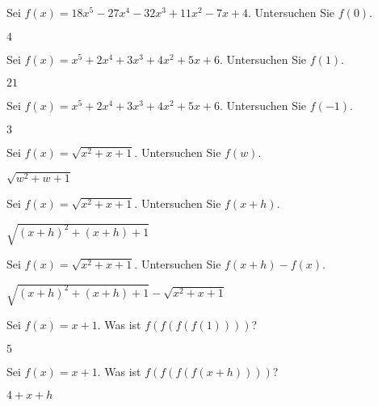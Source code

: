 \begin{exercises}
\begin{exercise} Sei $f(x) = 18x^5-27x^4-32x^3+11x^2 -7x +4$. Untersuchen Sie $f(0)$.
\begin{answer}
$4$
\end{answer}
\end{exercise}

\begin{exercise} Sei $f(x) = x^5+2x^4+3x^3+4x^2+5x+6$. Untersuchen Sie $f(1)$.
\begin{answer}
$21$
\end{answer}
\end{exercise}

\begin{exercise} Sei $f(x) = x^5+2x^4+3x^3+4x^2+5x+6$. Untersuchen Sie $f(-1)$.
\begin{answer}
$3$
\end{answer}
\end{exercise}

\begin{exercise} Sei $f(x) =\sqrt{x^2+x+1}$. Untersuchen Sie $f(w)$.
\begin{answer}
$\sqrt{w^2+w+1}$
\end{answer}
\end{exercise}

\begin{exercise} Sei $f(x) =\sqrt{x^2+x+1}$. Untersuchen Sie $f(x+h)$.
\begin{answer}
$\sqrt{(x+h)^2+(x+h)+1}$
\end{answer}
\end{exercise}

\begin{exercise} Sei $f(x) = \sqrt{x^2+x+1}$. Untersuchen Sie $f(x+h) - f(x)$.
\begin{answer}
$\sqrt{(x+h)^2+(x+h)+1} - \sqrt{x^2+x+1}$
\end{answer}
\end{exercise}

\begin{exercise} Sei $f(x) = x+1$. Was ist $f(f(f(f(1))))$?
\begin{answer}
$5$
\end{answer}
\end{exercise}

\begin{exercise} Sei $f(x) = x+1$. Was ist $f(f(f(f(x+h))))$?
\begin{answer}
$4+x+h$
\end{answer}
\end{exercise}


\end{exercises}
